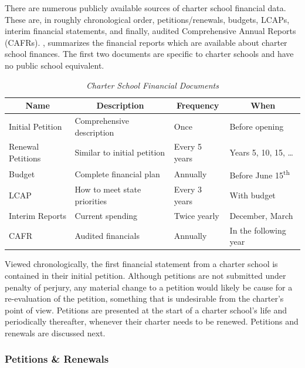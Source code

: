 There are numerous publicly available sources of charter school financial data. These are, in roughly chronological order, petitions/renewals, budgets, LCAPs,  interim financial statements, and finally, audited Comprehensive Annual Reports (CAFRs). , summarizes the financial reports which are available about charter school finances. The first two documents are specific to charter schools and have no public school equivalent.

\begin{table}[h]
  \centering\small%
  \caption[Charter School Financial Documents]{\textit{Charter School Financial Documents}}\label{tab:charter-fin-docs}%
  \begin{tabular}{llll}
    \toprule%
    \multicolumn{1}{c}{Name}  & \multicolumn{1}{c}{Description} & \multicolumn{1}{c}{Frequency} & \multicolumn{1}{c}{When} \\
    \midrule%
    Initial Petition  & Comprehensive description    & Once           & Before opening \\
    Renewal Petitions &  Similar to initial petition & Every 5 years  & Years 5, 10, 15, \ldots \\
    Budget            & Complete financial plan      & Annually       & Before June 15\textsuperscript{th} \\
    LCAP              & How to meet state priorities & Every 3 years  & With budget\\
    Interim Reports   & Current spending             & Twice yearly   & December, March \\
    CAFR              & Audited financials           & Annually       & In the following year \\
    \bottomrule%
  \end{tabular}
\end{table}%

Viewed chronologically, the first financial statement from a charter school is contained in their initial petition. Although petitions are not submitted under penalty of perjury, any material change to a petition would likely be cause for a re-evaluation of the petition, something that is undesirable from the charter's point of view. Petitions are presented at the start of a charter school's life and periodically thereafter, whenever their charter needs to be renewed. Petitions and renewals are discussed next.

\subsubsection{Petitions \& Renewals}\label{sec:petitions-renewals}\indent

